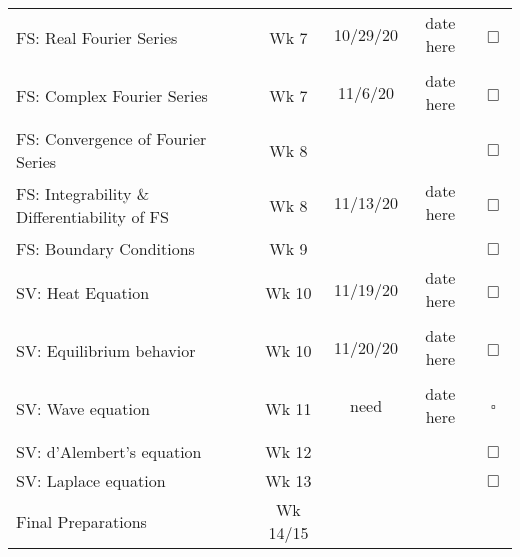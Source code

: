 \documentclass{article}
\newcommand{\checked}{\makebox[0pt][l]{$\checkmark$}$\square$}
\newcommand{\unchecked}{$\Box$}
\begin{document}
\begin{tabular}{|l|c|c|c|c}
\multirow{2}{5cm}{FS: Real Fourier Series} & \multirow{2}{1.5cm}{Wk 7}  & 10/29/20 & date here &  \multirow{2}{.4cm}{\unchecked} \\ &&&& \\ \cline{1-4}
\multirow{2}{5cm}{FS: Complex Fourier Series} & \multirow{2}{1.5cm}{Wk 7} & 11/6/20 & date here & \multirow{2}{.4cm}{\unchecked} \\ &&&& \\ \cline{1-4}
\multirow{2}{7cm}{FS: Convergence of Fourier Series} & \multirow{2}{1.5cm}{Wk 8} &&& \multirow{2}{.4cm}{\unchecked} \\ &&&& \\  \cline{1-4}
\multirow{2}{7cm}{FS: Integrability \& Differentiability of FS} & \multirow{2}{1.5cm}{Wk 8} & 11/13/20 & date here & \multirow{2}{.4cm}{\unchecked} \\ &&&& \\  \cline{1-4}
\multirow{2}{5cm}{FS: Boundary Conditions} & \multirow{2}{1.5cm}{Wk 9} &&& \multirow{2}{.4cm}{\unchecked} \\ &&&& \\ \cline{1-4}
\multirow{2}{5cm}{SV: Heat Equation} & \multirow{2}{1.5cm}{Wk 10} & 11/19/20 & date here & \multirow{2}{.4cm}{\unchecked} \\ &&&& \\ \cline{1-4}
\multirow{2}{5cm}{SV: Equilibrium behavior} & \multirow{2}{1.5cm}{Wk 10} & 11/20/20 & date here & \multirow{2}{.4cm}{\unchecked} \\ &&&& \\ \cline{1-4}
\multirow{2}{5cm}{SV: Wave equation} & \multirow{2}{1.5cm}{Wk 11} & need & date here & \multirow{2}{.4cm}{\checked} \\ &&&& \\ \cline{1-4}
\multirow{2}{5cm}{SV: d'Alembert's equation} & \multirow{2}{1.5cm}{Wk 12} &&& \multirow{2}{.4cm}{\unchecked} \\ &&&& \\ \cline{1-4}
\multirow{2}{5cm}{SV: Laplace equation} & \multirow{2}{1.5cm}{Wk 13} &&& \multirow{2}{.4cm}{\unchecked} \\ &&&& \\ \cline{1-4}
\multirow{2}{5cm}{Final Preparations} & \multirow{2}{1.8cm}{Wk 14/15} &&&   \\&&&& \\ \cline{1-4}
\end{tabular}
\newpage
\end{document}
